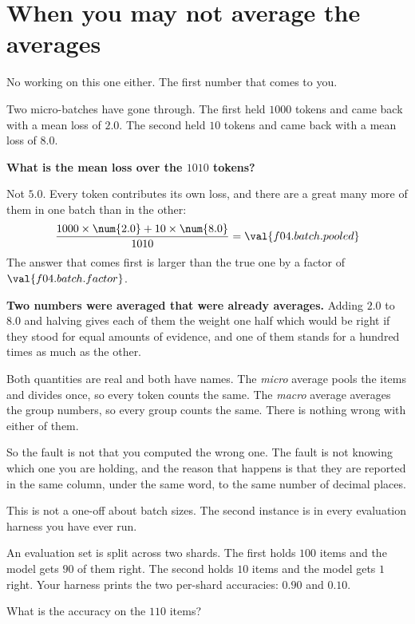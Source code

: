 \section{When you may not average the averages}
\label{sec:F04-averages}

\begin{fr}
No working on this one either. The first number that comes to you.

Two micro-batches have gone through. The first held $1000$ tokens and came
back with a mean loss of $\num{2.0}$. The second held $10$ tokens and came
back with a mean loss of $\num{8.0}$.

\textbf{What is the mean loss over the $1010$ tokens?}
\dotline
\nextframe
\end{fr}

\begin{fr}
Not $\num{5.0}$. Every token contributes its own loss, and there are a great
many more of them in one batch than in the other:
\[ \frac{1000 \times \num{2.0} + 10 \times \num{8.0}}{1010}
   = \val{f04.batch.pooled} \]
The answer that comes first is larger than the true one by a factor of
$\val{f04.batch.factor}$.

\begin{trapbox}
\textbf{Two numbers were averaged that were already averages.} Adding
$\num{2.0}$ to $\num{8.0}$ and halving gives each of them the weight one half
\dash{} which would be right if they stood for equal amounts of evidence, and
one of them stands for a hundred times as much as the other.

Both quantities are real and both have names. The \emph{micro} average pools
the items and divides once, so every token counts the same. The \emph{macro}
average averages the group numbers, so every group counts the same. There is
nothing wrong with either of them.

So the fault is not that you computed the wrong one. The fault is not knowing
which one you are holding, and the reason that happens is that they are
reported in the same column, under the same word, to the same number of
decimal places.
\end{trapbox}
\end{fr}

\begin{fr}
This is not a one-off about batch sizes. The second instance is in every
evaluation harness you have ever run.

An evaluation set is split across two shards. The first holds $100$ items and
the model gets $90$ of them right. The second holds $10$ items and the model
gets $1$ right. Your harness prints the two per-shard accuracies:
$\num{0.90}$ and $\num{0.10}$.

What is the accuracy on the $110$ items?
\nextframe
\end{fr}

